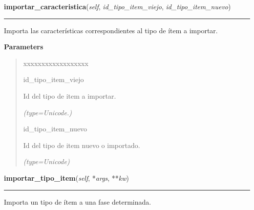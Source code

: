 \hspace{.8\funcindent}\begin{boxedminipage}{\funcwidth}

    \raggedright \textbf{importar\_caracteristica}(\textit{self}, \textit{id\_tipo\_item\_viejo}, \textit{id\_tipo\_item\_nuevo})

    \vspace{-1.5ex}

    \rule{\textwidth}{0.5\fboxrule}
\setlength{\parskip}{2ex}
    Importa las características correspondientes al tipo de ítem a 
    importar.

\setlength{\parskip}{1ex}
      \textbf{Parameters}
      \vspace{-1ex}

      \begin{quote}
        \begin{Ventry}{xxxxxxxxxxxxxxxxxx}

          \item[id\_tipo\_item\_viejo]

          Id del tipo de item a importar.

            {\it (type=Unicode.)}

          \item[id\_tipo\_item\_nuevo]

          Id del tipo de item nuevo o importado.

            {\it (type=Unicode)}

        \end{Ventry}

      \end{quote}

    \end{boxedminipage}

    \label{saip:controllers:tipo_item_controller_nuevo:TipoItemControllerNuevo:importar_tipo_item}

    \vspace{0.5ex}

\hspace{.8\funcindent}\begin{boxedminipage}{\funcwidth}

    \raggedright \textbf{importar\_tipo\_item}(\textit{self}, *\textit{args}, **\textit{kw})

    \vspace{-1.5ex}

    \rule{\textwidth}{0.5\fboxrule}
\setlength{\parskip}{2ex}
    Importa un tipo de ítem a una fase determinada.

\setlength{\parskip}{1ex}
    \end{boxedminipage}


